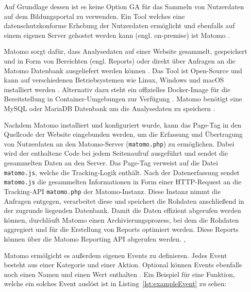 Auf Grundlage dessen ist es keine Option GA für das Sammeln von Nutzerdaten auf dem Bildungsportal zu verwenden. Ein Tool welches eine datenschutzkonforme Erhebung der Nutzerdaten ermöglicht und ebenfalls auf einem eigenen Server gehostet werden kann (engl. on-premise) ist Matomo \parencite{Förster2024}.

Matomo sorgt dafür, dass Analysedaten auf einer Website gesammelt, gespeichert und in Form von Bereichten (engl. Reports) oder direkt über Anfragen an die Matomo Datenbank ausgeliefert werden können \parencite{MatomoHowItWorks}. Das Tool ist Open-Source und kann auf verschiedenen Betriebsystemen wie Linux, Windows und macOS installiert werden \parencite{MatomoRequirements}. Alternativ dazu steht ein offizielles Docker-Image für die Bereitstellung in Container-Umgebungen zur Verfügung \parencite{MatomoDocker}. Matomo benötigt eine MySQL oder MariaDB Datenbank um die Analysedaten zu speichern \parencite{MatomoRequirements}. 

Nachdem Matomo installiert und konfiguriert wurde, kann das Page-Tag in den Quellcode der Website eingebunden werden, um die Erfassung und Übertragung von Nutzerdaten an den Matomo-Server (\texttt{matomo.php}) zu ermöglichen. Dabei wird der enthaltene Code bei jedem Seitenaufruf ausgeführt und sendet die gesammelten Daten an den Server. Das Page-Tag verweist auf die Datei \texttt{matomo.js}, welche die Tracking-Logik enthält. Nach der Datenerfassung sendet \texttt{matomo.js} die gesammelten Informationen in Form einer HTTP-Request an die Tracking-API \texttt{matomo.php} der Matomo-Instanz. Diese Instanz nimmt die Anfragen entgegen, verarbeitet diese und speichert die Rohdaten anschließend in der zugrunde liegenden Datenbank. Damit die Daten effizient abgerufen werden können, durchläuft Matomo einen Archivierungsprozess, bei dem die Rohdaten aggregiert und für die Erstellung von Reports optimiert werden. Diese Reports können über die Matomo Reporting API abgerufen werden. \parencite{MatomoHowItWorks}, \parencite{MatomoTrackingClient}

Matomo ermölgicht es außerdem eigenen Events zu definieren. Jedes Event besteht aus einer Kategorie und einer Aktion. Optional können Events ebenfalls noch einen Namen und einen Wert enthalten \parencite{MatomoEvent}. Ein Beispiel für eine Funktion, welche ein solches Event auslöst ist in Listing~\ref{lst:exampleEvent} zu sehen: 

\begin{figure}[H]
    \centering
    \begin{minipage}{\textwidth}
        
    \end{minipage}
\end{figure}


